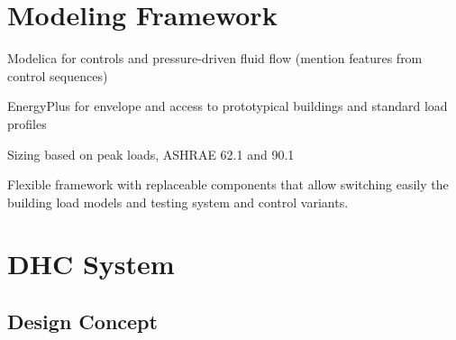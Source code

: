 \section{Modeling Framework} \label{sec:modeling}

Modelica for controls and pressure-driven fluid flow (mention features from control sequences)

EnergyPlus for envelope and access to prototypical buildings and standard load profiles

Sizing based on peak loads, ASHRAE 62.1 and 90.1

Flexible framework with replaceable components that allow switching easily the building load models and testing system and control variants.




\section{DHC System} \label{sec:dhc}



\subsection{Design Concept} \label{sec:concept}

